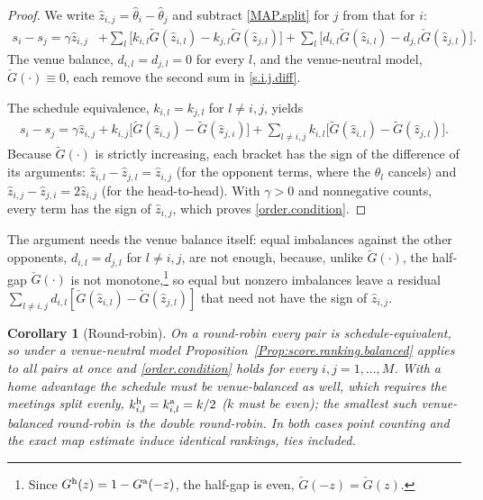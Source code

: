 \documentclass[letterpaper,12pt]{article}
\newcommand{\tnr}[1]{{\textnormal{#1}}}
\newcommand{\cd}{\cdot}
\newcommand{\ld}{\ldots}
\newtheorem{corollary}{Corollary}
\begin{document}
\begin{proof}
We write $\hat z_{i,j}=\hat\theta_i - \hat\theta_j$ and subtract \eqref{MAP.split} for $j$ from that for $i$:
\begin{align}
\label{s.i.j.diff}
    s_i-s_j=\gamma\hat z_{i,j}
    &+\sum_l\bigl[k_{i,l}\tilde G(\hat z_{i,l})-k_{j,l}\tilde G(\hat z_{j,l})\bigr]
    +\sum_l\bigl[d_{i,l}\check G(\hat z_{i,l})-d_{j,l}\check G(\hat z_{j,l})\bigr].
\end{align}
The venue balance, $d_{i,l}=d_{j,l}=0$ for every $l$, and the venue-neutral model, $\check G(\cd)\equiv0$, each remove the second sum in \eqref{s.i.j.diff}.

The schedule equivalence, $k_{i,l}=k_{j,l}$ for $l\ne i,j$, yields
\begin{align*}
    s_i-s_j=\gamma\hat z_{i,j}+k_{i,j}\bigl[\tilde G(\hat z_{i,j})-\tilde G(\hat z_{j,i})\bigr]
    +\sum_{l\ne i,j}k_{i,l}\bigl[\tilde G(\hat z_{i,l})-\tilde G(\hat z_{j,l})\bigr].
\end{align*}
Because $\tilde G(\cd)$ is strictly increasing, each bracket has the sign of the difference of its arguments: $\hat z_{i,l}-\hat z_{j,l}=\hat z_{i,j}$ (for the opponent terms, where the $\hat\theta_l$ cancels) and $\hat z_{i,j}-\hat z_{j,i}=2\hat z_{i,j}$ (for the head-to-head). With $\gamma>0$ and nonnegative counts, every term has the sign of $\hat{z}_{i,j}$, which proves \eqref{order.condition}. 
\end{proof}

The argument needs the venue balance itself: equal imbalances against the other opponents, $d_{i,l}=d_{j,l}$ for $l\ne i,j$, are not enough, because, unlike $\tilde G(\cd)$, the half-gap $\check G(\cd)$ is not monotone,\footnote{Since $G^\tnr{h}(z)=1-G^\tnr{a}(-z)$, the half-gap is even, $\check G(-z)=\check G(z)$.} so equal but nonzero imbalances leave a residual $\sum_{l\ne i,j} d_{i,l}[\check G(\hat z_{i,l})-\check G(\hat z_{j,l})]$ that need not have the sign of $\hat z_{i,j}$.

\begin{corollary}[Round-robin]\label{Cor:round.robin}
On a round-robin every pair is schedule-equivalent, so under a venue-neutral model Proposition~\ref{Prop:score.ranking.balanced} applies to all pairs at once and \eqref{order.condition} holds for every $i,j=1,\ld,M$. With a home advantage the schedule must be venue-balanced as well, which requires the meetings split evenly, $k^\tnr{h}_{i,l}=k^\tnr{a}_{i,l}=k/2$ ($k$ must be even); the smallest such venue-balanced round-robin is the double round-robin. In both cases point counting and the exact \gls{map} estimate induce identical rankings, ties included.
\end{corollary}
\end{document}
